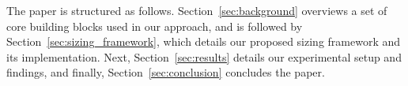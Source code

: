 The paper is structured as follows. Section~\ref{sec:background} overviews a set of core building blocks used in our approach, and is followed by Section~\ref{sec:sizing_framework}, which details our proposed sizing framework and its implementation. Next, Section~\ref{sec:results} details our experimental setup and findings, and finally, Section~\ref{sec:conclusion} concludes the paper.
